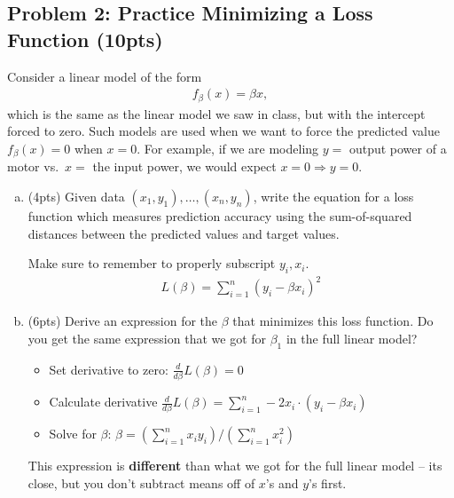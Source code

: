 \documentclass[10pt]{article}
\begin{document}
\newpage
\subsection{Problem 2: Practice Minimizing a Loss Function (10pts)}
Consider a linear model of the form
\begin{align*}
f_{\beta}(x) = \beta x,
\end{align*}
which is the same as the linear model we saw in class, but with the intercept forced to zero.  Such models are used when we want to force the predicted value $f_{\beta}(x)=0$ when
$x=0$.  For example, if we are modeling $y=$ output power of a motor
vs.\ $x=$ the input power, we would expect $x=0 \Rightarrow y=0$.
\begin{enumerate}[(a)]
	\item (4pts) Given data $(x_1,y_1), \ldots, (x_n,y_n)$,
	write the equation for a loss function which measures prediction accuracy using the sum-of-squared distances between the predicted values and target values. 
	
	Make sure to remember to properly subscript $y_i, x_i$.
	\begin{align*}
	L(\beta) = \sum_{i=1}^n (y_i - \beta x_i)^2
	\end{align*}
	
	\item (6pts) Derive an expression for the $\beta$ that minimizes this loss function. Do you get the same expression that we got for $\beta_1$ in the full linear model? 
	
	\begin{itemize}
		\item Set derivative to zero: $\frac{d}{d\beta} L(\beta) = 0$
		\item Calculate derivative $\frac{d}{d\beta} L(\beta) = \sum_{i=1}^n -2x_i\cdot(y_i - \beta x_i)$
		\item Solve for $\beta$: $\beta = (\sum_{i=1}^n x_iy_i)/ (\sum_{i=1}^n x_i^2)$
	\end{itemize}
This expression is \textbf{different} than what we got for the full linear model -- its close, but you don't subtract means off of $x$'s and $y$'s first. 
\end{enumerate}

\newpage
\end{document}
